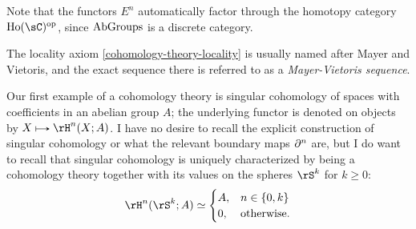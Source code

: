 \begin{nothing}
  \begin{subremark}
    \label{cohomology-theory-homotopy-factor}
    Note that the functors $E^n$ automatically factor through the homotopy category $\Ho(\sC)^\op$, since $\mathrm{AbGroups}$ is a discrete category.
  \end{subremark}

  \begin{subremark*}
    The locality axiom \cref{cohomology-theory-locality} is usually named after Mayer and Vietoris, and the exact sequence there is referred to as a \emph{Mayer-Vietoris sequence}.
  \end{subremark*}
\end{nothing}

\begin{example}
  \label{singular-cohomology}
  Our first example of a cohomology theory is singular cohomology of spaces with coefficients in an abelian group $A$; the underlying functor is denoted on objects by $X \mapsto \rH^n(X;A)$. I have no desire to recall the explicit construction of singular cohomology or what the relevant boundary maps $\partial^n$ are, but I do want to recall that singular cohomology is uniquely characterized by being a cohomology theory together with its values on the spheres $\rS^k$ for $k \ge 0$:
  \[
    \rH^n(\rS^k;A) \iso
    \begin{cases}
      A, & n \in \{0,k\} \\
      0, & \text{otherwise}.
    \end{cases}
  \]
\end{example}

